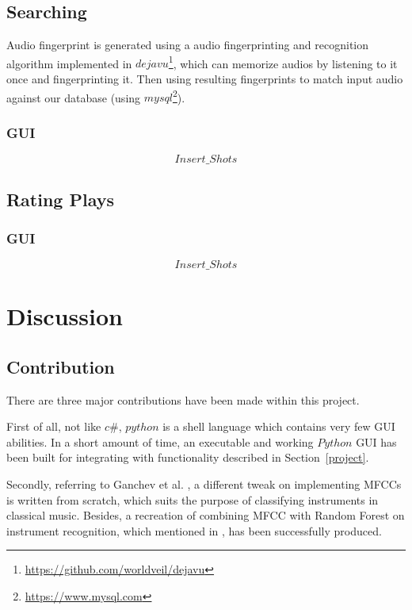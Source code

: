\documentclass[whitelogo,12pt]{tudelft-report}
\begin{document}
\section{Searching}
Audio fingerprint is generated using a audio fingerprinting and recognition algorithm implemented in $dejavu$\footnote{\url{https://github.com/worldveil/dejavu}}, which can memorize audios by listening to it once and fingerprinting it. Then using resulting fingerprints to match input audio against our database (using $mysql$\footnote{\url{https://www.mysql.com}}).

\subsection{GUI}
\[Insert\_Shots\]

\section{Rating Plays}
\subsection{GUI}
\[Insert\_Shots\]

\chapter{Discussion}
\section{Contribution}
There are three major contributions have been made within this project. 

First of all, not like $c\#$, $python$ is a shell language which contains very few GUI abilities. In a short amount of time, an executable and working $Python$ GUI has been built for integrating with functionality described in Section~\ref{project}. 

Secondly, referring to Ganchev et al. \cite{ganchev2005}, a different tweak on implementing MFCCs is written from scratch, which suits the purpose of classifying instruments in classical music. Besides, a recreation of combining MFCC with Random Forest on instrument recognition, which mentioned in \cite{li2015}, has been successfully produced.
\end{document}
